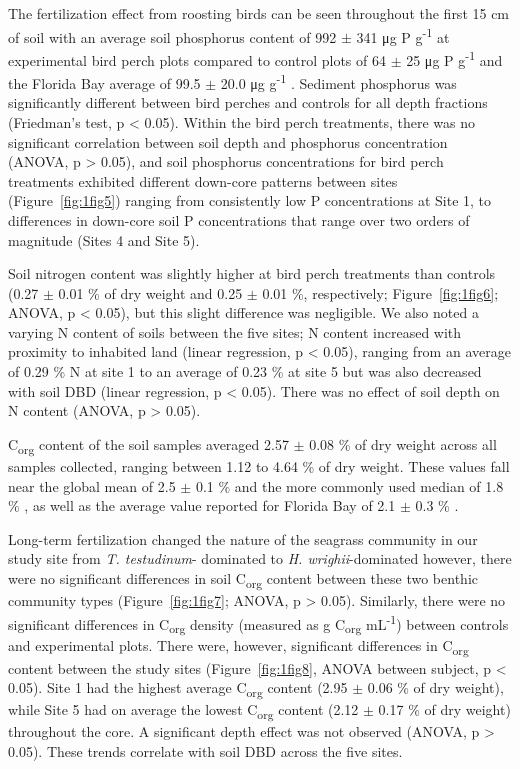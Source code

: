 	The fertilization effect from roosting birds can be seen throughout the first 15 cm of soil with an average soil phosphorus content of 992 $\pm$ 341 μg P g\textsuperscript{-1} at experimental bird perch plots compared to control plots of 64 $\pm$ 25 μg P g\textsuperscript{-1} and the Florida Bay average of 99.5 $\pm$ 20.0 μg g\textsuperscript{-1} \citep{Fourqurean:2012hu}. Sediment phosphorus was significantly different between bird perches and controls for all depth fractions (Friedman’s test, p < 0.05). Within the bird perch treatments, there was no significant correlation between soil depth and phosphorus concentration (ANOVA, p > 0.05), and soil phosphorus concentrations for bird perch treatments exhibited different down-core patterns between sites (Figure~\ref{fig:1fig5}) ranging from consistently low P concentrations at Site 1, to differences in down-core soil P concentrations that range over two orders of magnitude (Sites 4 and Site 5).

	Soil nitrogen content was slightly higher at bird perch treatments than controls (0.27 $\pm$ 0.01 \% of dry weight and 0.25 $\pm$ 0.01 \%, respectively; Figure~\ref{fig:1fig6}; ANOVA, p < 0.05), but this slight difference was negligible. We also noted a varying N content of soils between the five sites; N content increased with proximity to inhabited land (linear regression, p < 0.05), ranging from an average of 0.29 \% N at site 1 to an average of 0.23 \% at site 5 but was also decreased with soil DBD (linear regression, p < 0.05). There was no effect of soil depth on N content (ANOVA, p > 0.05).

	C\textsubscript{org} content of the soil samples averaged 2.57 $\pm$ 0.08 \% of dry weight across all samples collected, ranging between 1.12 to 4.64 \% of dry weight. These values fall near the global mean of 2.5 $\pm$ 0.1 \% and the more commonly used median of 1.8 \% \citep{Fourqurean:2012cv}, as well as the average value reported for Florida Bay of 2.1 $\pm$ 0.3 \% \citep{Fourqurean:2012hu}.

	Long-term fertilization changed the nature of the seagrass community in our study site from \textit{T. testudinum}- dominated to \textit{H. wrighii}-dominated however, there were no significant differences in soil C\textsubscript{org} content between these two benthic community types (Figure~\ref{fig:1fig7}; ANOVA, p > 0.05). Similarly, there were no significant differences in C\textsubscript{org} density (measured as g C\textsubscript{org} mL\textsuperscript{-1}) between controls and experimental plots. There were, however, significant differences in C\textsubscript{org} content between the study sites (Figure~\ref{fig:1fig8}, ANOVA between subject, p < 0.05). Site 1 had the highest average C\textsubscript{org} content (2.95 $\pm$ 0.06 \% of dry weight), while Site 5 had on average the lowest C\textsubscript{org} content (2.12 $\pm$ 0.17 \% of dry weight) throughout the core. A significant depth effect was not observed (ANOVA, p > 0.05). These trends correlate with soil DBD across the five sites.

